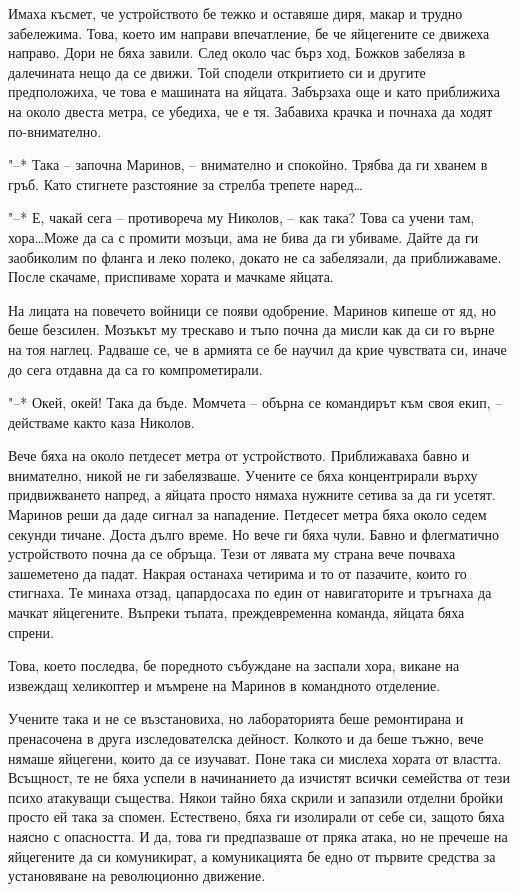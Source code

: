 \documentclass[ebook,openany,12pt]{memoir}
\begin{document}
Имаха късмет, че устройството бе тежко и оставяше диря, макар и трудно забележима. Това, което им направи впечатление, бе че яйцегените се движеха направо. Дори не бяха завили. След около час бърз ход, Божков забеляза в далечината нещо да се движи. Той сподели откритието си и другите предположиха, че това е машината на яйцата. Забързаха още и като приближиха на около двеста метра, се убедиха, че е тя. Забавиха крачка и почнаха да ходят по-внимателно.

"--* Така -- започна Маринов, – внимателно и спокойно. Трябва да ги хванем в гръб. Като стигнете разстояние за стрелба трепете наред\ldots

"--* Е, чакай сега – противореча му Николов, – как така? Това са учени там, хора\ldots Може да са с промити мозъци, ама не бива да ги убиваме. Дайте да ги заобиколим по фланга и леко полеко, докато не са забелязали, да приближаваме. После скачаме, приспиваме хората и мачкаме яйцата.

На лицата на повечето войници се появи одобрение. Маринов кипеше от яд, но беше безсилен. Мозъкът му трескаво и тъпо почна да мисли как да си го върне на тоя наглец. Радваше се, че в армията се бе научил да крие чувствата си, иначе до сега отдавна да са го компрометирали.

"--* Окей, окей! Така да бъде. Момчета – обърна се командирът към своя екип, – действаме както каза Николов.

Вече бяха на около петдесет метра от устройството. Приближаваха бавно и внимателно, никой не ги забелязваше. Учените се бяха концентрирали върху придвижването напред, а яйцата просто нямаха нужните сетива за да ги усетят. Маринов реши да даде сигнал за нападение. Петдесет метра бяха около седем секунди тичане. Доста дълго време. Но вече ги бяха чули. Бавно и флегматично устройството почна да се обръща. Тези от лявата му страна вече почваха зашеметено да падат. Накрая останаха четирима и то от пазачите, които го стигнаха. Те минаха отзад, цапардосаха по един от навигаторите и тръгнаха да мачкат яйцегените. Въпреки тъпата, преждевременна команда, яйцата бяха спрени.

Това, което последва, бе поредното събуждане на заспали хора, викане на извеждащ хеликоптер и мъмрене на Маринов в командното отделение.

Учените така и не се възстановиха, но лабораторията беше ремонтирана и пренасочена в друга изследователска дейност. Колкото и да беше тъжно, вече нямаше яйцегени, които да се изучават. Поне така си мислеха хората от властта. Всъщност, те не бяха успели в начинанието да изчистят всички семейства от тези психо атакуващи същества. Някои тайно бяха скрили и запазили отделни бройки просто ей така за спомен. Естествено, бяха ги изолирали от себе си, защото бяха наясно с опасността. И да, това ги предпазваше от пряка атака, но не пречеше на яйцегените да си комуникират, а комуникацията бе едно от първите средства за установяване на революционно движение.
\end{document}
